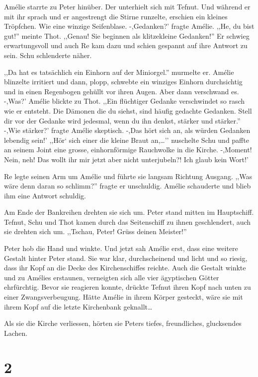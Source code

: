 \documentclass[11pt,titlepage,a5paper]{book}
\begin{document}
Amélie starrte zu Peter hinüber. Der unterhielt sich mit Tefnut. Und während er mit ihr sprach und er angestrengt die Stirne runzelte, erschien ein kleines Tröpfchen. Wie eine winzige Seifenblase. -,Gedanken?' fragte Amélie. ,,He, du bist gut!'' meinte Thot. ,,Genau! Sie beginnen als klitzekleine Gedanken!'' Er schwieg erwartungsvoll und auch Re kam dazu und schien gespannt auf ihre Antwort zu sein. Schu schlenderte näher.

,,Da hat es tatsächlich ein Einhorn auf der Miniorgel.'' murmelte er. Amélie blinzelte irritiert und dann, plopp, schwebte ein winziges Einhorn durchsichtig und in einen Regenbogen gehüllt vor ihren Augen. Aber dann verschwand es. -,Was?' Amélie blickte zu Thot. ,,Ein flüchtiger Gedanke verschwindet so rasch wie er entsteht. Die Dämonen die du siehst, sind häufig gedachte Gedanken. Stell dir vor der Gedanke wird jedesmal, wenn du ihn denkst, stärker und stärker.'' -,Wie stärker?' fragte Amélie skeptisch. -,Das hört sich an, als würden Gedanken lebendig sein!' ,,Hör` sich einer die kleine Braut an,\dots'' nuschelte Schu und paffte an seinem Joint eine grosse, einhornförmige Rauchwolke in die Kirche. -,Moment! Nein, neh! Das wollt ihr mir jetzt aber nicht unterjubeln?! Ich glaub kein Wort!'

Re legte seinen Arm um Amélie und führte sie langsam Richtung Ausgang. ,,Was  wäre denn daran so schlimm?'' fragte er unschuldig. Amélie schauderte und blieb ihm eine Antwort schuldig.

Am Ende der Bankreihen drehten sie sich um. Peter stand mitten im Hauptschiff. Tefnut, Schu und Thot kamen durch das Seitenschiff zu ihnen geschlendert, auch sie drehten sich um. ,,Tschau, Peter! Grüss deinen Meister!''

Peter hob die Hand und winkte. Und jetzt sah Amélie erst, dass eine weitere Gestalt hinter Peter stand. Sie war klar, durchscheinend und licht und so riesig, dass ihr Kopf an die Decke des Kirchenschiffes reichte. Auch die Gestalt winkte und zu Amélies erstaunen, verneigten sich alle vier ägyptischen Götter ehrfürchtig. Bevor sie reagieren konnte, drückte Tefnut ihren Kopf nach unten zu einer Zwangsverbeugung. Hätte Amélie in ihrem Körper gesteckt, wäre sie mit ihrem Kopf auf die letzte Kirchenbank geknallt\dots 

Als sie die Kirche verliessen, hörten sie Peters tiefes, freundliches, glucksendes Lachen.

\section*{2}
\end{document}
